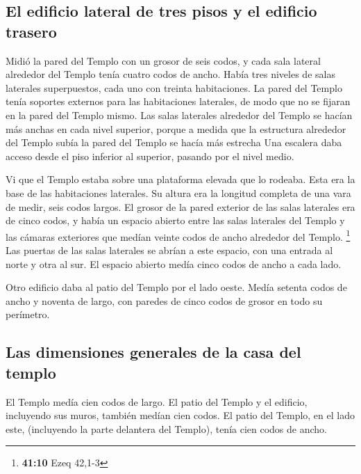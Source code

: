 \hypertarget{el-edificio-lateral-de-tres-pisos-y-el-edificio-trasero}{%
\subsection{El edificio lateral de tres pisos y el edificio
trasero}\label{el-edificio-lateral-de-tres-pisos-y-el-edificio-trasero}}

 Midió la pared del Templo con un grosor de seis codos, y
cada sala lateral alrededor del Templo tenía cuatro codos de ancho.
 Había tres niveles de salas laterales superpuestos, cada
uno con treinta habitaciones. La pared del Templo tenía soportes
externos para las habitaciones laterales, de modo que no se fijaran en
la pared del Templo mismo.  Las salas laterales alrededor
del Templo se hacían más anchas en cada nivel superior, porque a medida
que la estructura alrededor del Templo subía la pared del Templo se
hacía más estrecha Una escalera daba acceso desde el piso inferior al
superior, pasando por el nivel medio.

 Vi que el Templo estaba sobre una plataforma elevada que
lo rodeaba. Esta era la base de las habitaciones laterales. Su altura
era la longitud completa de una vara de medir, seis codos largos.
 El grosor de la pared exterior de las salas laterales era
de cinco codos, y había un espacio abierto entre las salas laterales del
Templo  y las cámaras exteriores que medían veinte codos
de ancho alrededor del Templo. \footnote{\textbf{41:10} Ezeq 42,1-3}
 Las puertas de las salas laterales se abrían a este
espacio, con una entrada al norte y otra al sur. El espacio abierto
medía cinco codos de ancho a cada lado.

 Otro edificio daba al patio del Templo por el lado
oeste. Medía setenta codos de ancho y noventa de largo, con paredes de
cinco codos de grosor en todo su perímetro.

\hypertarget{las-dimensiones-generales-de-la-casa-del-templo}{%
\subsection{Las dimensiones generales de la casa del
templo}\label{las-dimensiones-generales-de-la-casa-del-templo}}

 El Templo medía cien codos de largo. El patio del Templo
y el edificio, incluyendo sus muros, también medían cien codos.
 El patio del Templo, en el lado este, (incluyendo la
parte delantera del Templo), tenía cien codos de ancho.

